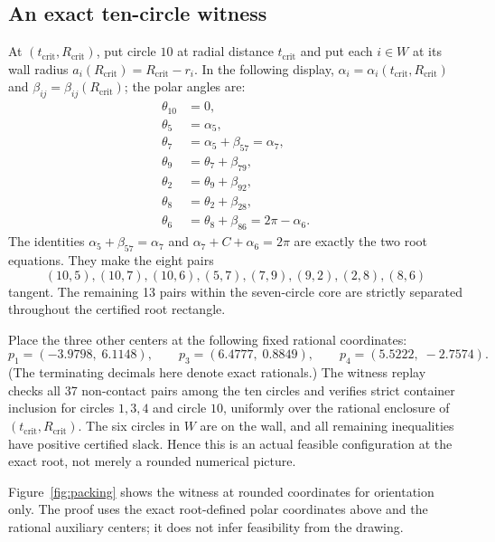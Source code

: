 \documentclass[11pt,a4paper]{article}
\theoremstyle{remark}
\newcommand{\Rcrit}{R_{\mathrm{crit}}}
\begin{document}
\subsection{An exact ten-circle witness}
\label{sec:witness}

At $(t_{\mathrm{crit}},\Rcrit)$, put circle $10$ at radial distance
$t_{\mathrm{crit}}$ and put each $i\in W$ at its wall radius
$a_i(\Rcrit)=\Rcrit-r_i$.  In the following display,
$\alpha_i=\alpha_i(t_{\mathrm{crit}},\Rcrit)$ and
$\beta_{ij}=\beta_{ij}(\Rcrit)$; the polar angles are:
\begin{align*}
 \theta_{10}&=0,\\
 \theta_5&=\alpha_5,\\
 \theta_7&=\alpha_5+\beta_{57}=\alpha_7,\\
 \theta_9&=\theta_7+\beta_{79},\\
 \theta_2&=\theta_9+\beta_{92},\\
 \theta_8&=\theta_2+\beta_{28},\\
 \theta_6&=\theta_8+\beta_{86}=2\pi-\alpha_6.
\end{align*}
The identities $\alpha_5+\beta_{57}=\alpha_7$ and
$\alpha_7+C+\alpha_6=2\pi$ are exactly the two root equations.  They make
the eight pairs
\[
 (10,5),(10,7),(10,6),(5,7),(7,9),(9,2),(2,8),(8,6)
\]
tangent.  The remaining 13 pairs within the seven-circle core are
strictly separated throughout the certified root rectangle.

Place the three other centers at the following fixed rational coordinates:
\[
 p_1=(-3.9798,\;6.1148),\qquad
 p_3=(6.4777,\;0.8849),\qquad
 p_4=(5.5222,\;-2.7574).
\]
(The terminating decimals here denote exact rationals.)  The witness replay
checks all 37 non-contact pairs among the ten circles and verifies strict
container inclusion for circles $1,3,4$ and circle $10$, uniformly over the
rational enclosure of $(t_{\mathrm{crit}},\Rcrit)$.  The six circles in $W$
are on the wall, and all remaining inequalities have positive certified
slack.  Hence this is an actual feasible configuration at the exact root,
not merely a rounded numerical picture.

Figure~\ref{fig:packing} shows the witness at rounded coordinates for
orientation only.  The proof uses the exact root-defined polar coordinates
above and the rational auxiliary centers; it does not infer feasibility from
the drawing.
\end{document}
